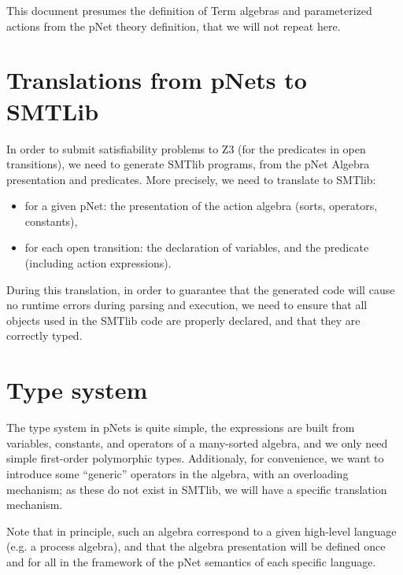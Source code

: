 \documentclass[a4paper]{llncs}
\begin{document}
This document presumes the definition of Term algebras and
parameterized actions from the pNet
theory definition, that we will not repeat here.

\section{Translations from pNets to SMTLib}
In order to submit satisfiability problems to Z3 (for the predicates
in open transitions), we need to generate SMTlib programs, from the
pNet Algebra presentation and predicates.
More precisely, we need to translate to SMTlib:
\begin{itemize}
  \item for a given pNet: the presentation of the action algebra
    (sorts, operators, constants), 
    \item for each open transition: the declaration of variables, and
      the predicate (including action expressions).
\end{itemize}

During this translation, in order to guarantee that the generated code
will cause no runtime errors during parsing and execution, we need
to ensure that all objects used in the SMTlib code are properly
declared, and that they are correctly typed.


\section{Type system}
The type system in pNets is quite simple, the expressions are built
from variables, constants, and operators of a many-sorted algebra, and
we only need simple first-order polymorphic types.
Additionaly, for convenience, we want to introduce some ``generic''
operators in the algebra, with an overloading mechanism; as these do
not exist in SMTlib, we will have a specific translation mechanism.

Note that in principle, such an algebra correspond to a given
high-level language (e.g. a process algebra), and that the algebra
presentation will be defined once and for all in the framework of the
pNet semantics of each specific language.
\end{document}
